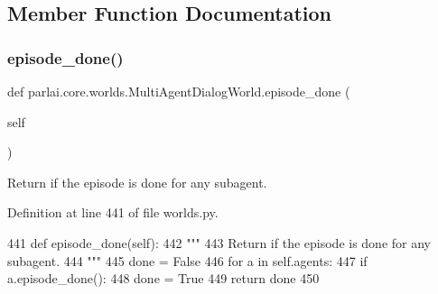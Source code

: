 \subsection{Member Function Documentation}
\mbox{\label{classparlai_1_1core_1_1worlds_1_1MultiAgentDialogWorld_a341fb4b45fd697d9b0978cb1ed1b26d2}} 
\subsubsection{\texorpdfstring{episode\+\_\+done()}{episode\_done()}}
{\footnotesize\ttfamily def parlai.\+core.\+worlds.\+Multi\+Agent\+Dialog\+World.\+episode\+\_\+done (\begin{DoxyParamCaption}\item[{}]{self }\end{DoxyParamCaption})}

\begin{DoxyVerb}Return if the episode is done for any subagent.
\end{DoxyVerb}
 

Definition at line 441 of file worlds.\+py.


\begin{DoxyCode}
441     \textcolor{keyword}{def }episode\_done(self):
442         \textcolor{stringliteral}{"""}
443 \textcolor{stringliteral}{        Return if the episode is done for any subagent.}
444 \textcolor{stringliteral}{        """}
445         done = \textcolor{keyword}{False}
446         \textcolor{keywordflow}{for} a \textcolor{keywordflow}{in} self.agents:
447             \textcolor{keywordflow}{if} a.episode\_done():
448                 done = \textcolor{keyword}{True}
449         \textcolor{keywordflow}{return} done
450 
\end{DoxyCode}
\mbox{\label{classparlai_1_1core_1_1worlds_1_1MultiAgentDialogWorld_ade057311db0368be26ac8b196619b862}} 
